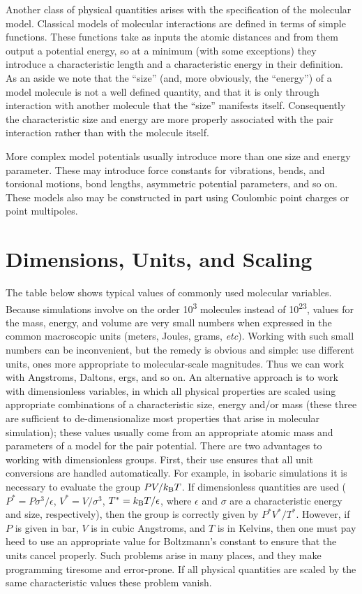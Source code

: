 \documentclass[9pt,bestpractices]{molsim}
\begin{document}
Another class of physical quantities arises with the specification of
the molecular model. Classical models of molecular interactions are
defined in terms of simple functions. These functions take as inputs the
atomic distances and from them output a potential energy, so at a
minimum (with some exceptions) they introduce a characteristic length
and a characteristic energy in their definition. As an aside we note
that the ``size'' (and, more obviously, the ``energy'') of a model
molecule is not a well defined quantity, and that it is only through
interaction with another molecule that the ``size'' manifests itself.
Consequently the characteristic size and energy are more properly
associated with the pair interaction rather than with the molecule
itself.

More complex model potentials usually introduce more than one size and
energy parameter. These may introduce force constants for vibrations,
bends, and torsional motions, bond lengths, asymmetric potential
parameters, and so on. These models also may be constructed in part
using Coulombic point charges or point multipoles.

\section{Dimensions, Units, and
Scaling}\label{dimensions-units-and-scaling}

The table below shows typical values of commonly used
molecular variables. Because simulations involve on the order
10\textsuperscript{3} molecules instead of 10\textsuperscript{23},
values for the mass, energy, and volume are very small numbers when
expressed in the common macroscopic units (meters, Joules, grams,
\emph{etc}). Working with such small numbers can be inconvenient, but
the remedy is obvious and simple: use different units, ones more
appropriate to molecular-scale magnitudes. Thus we can work with
Angstroms, Daltons, ergs, and so on. An alternative approach is to work
with dimensionless variables, in which all physical properties are
scaled using appropriate combinations of a characteristic size, energy
and/or mass (these three are sufficient to de-dimensionalize most
properties that arise in molecular simulation); these values usually
come from an appropriate atomic mass and parameters of a model for the
pair potential. There are two advantages to working with dimensionless
groups. First, their use ensures that all unit conversions are handled
automatically. For example, in isobaric simulations it is necessary to
evaluate the group $PV/k_{\rm B}T$. If dimensionless quantities are used ($P^* =
P\sigma^3/\epsilon$, $V^* = V/\sigma^3$, $T^* = k_{\rm B}T/\epsilon$, where $\epsilon$
and $\sigma$ are a characteristic energy and size, respectively), then the
group is correctly given by $P^*V^*/T^*$. However, if $P$ is given in
bar, $V$ is in cubic Angstroms, and $T$ is in Kelvins, then one must
pay heed to use an appropriate value for Boltzmann's constant to ensure
that the units cancel properly. Such problems arise in many places, and
they make programming tiresome and error-prone. If all physical
quantities are scaled by the same characteristic values these problem
vanish.
\end{document}
